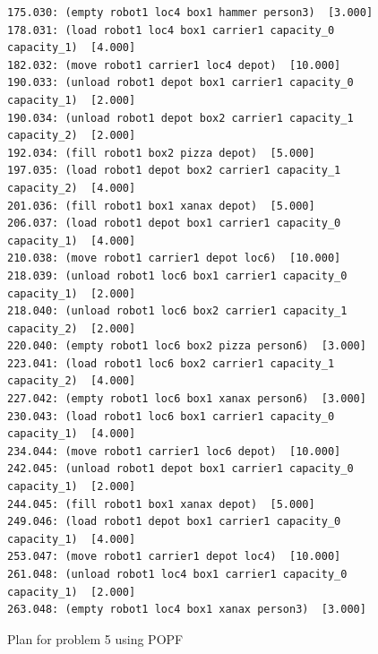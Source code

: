 \begin{figure}[h!]
\begin{verbatim}
175.030: (empty robot1 loc4 box1 hammer person3)  [3.000]
178.031: (load robot1 loc4 box1 carrier1 capacity_0 capacity_1)  [4.000]
182.032: (move robot1 carrier1 loc4 depot)  [10.000]
190.033: (unload robot1 depot box1 carrier1 capacity_0 capacity_1)  [2.000]
190.034: (unload robot1 depot box2 carrier1 capacity_1 capacity_2)  [2.000]
192.034: (fill robot1 box2 pizza depot)  [5.000]
197.035: (load robot1 depot box2 carrier1 capacity_1 capacity_2)  [4.000]
201.036: (fill robot1 box1 xanax depot)  [5.000]
206.037: (load robot1 depot box1 carrier1 capacity_0 capacity_1)  [4.000]
210.038: (move robot1 carrier1 depot loc6)  [10.000]
218.039: (unload robot1 loc6 box1 carrier1 capacity_0 capacity_1)  [2.000]
218.040: (unload robot1 loc6 box2 carrier1 capacity_1 capacity_2)  [2.000]
220.040: (empty robot1 loc6 box2 pizza person6)  [3.000]
223.041: (load robot1 loc6 box2 carrier1 capacity_1 capacity_2)  [4.000]
227.042: (empty robot1 loc6 box1 xanax person6)  [3.000]
230.043: (load robot1 loc6 box1 carrier1 capacity_0 capacity_1)  [4.000]
234.044: (move robot1 carrier1 loc6 depot)  [10.000]
242.045: (unload robot1 depot box1 carrier1 capacity_0 capacity_1)  [2.000]
244.045: (fill robot1 box1 xanax depot)  [5.000]
249.046: (load robot1 depot box1 carrier1 capacity_0 capacity_1)  [4.000]
253.047: (move robot1 carrier1 depot loc4)  [10.000]
261.048: (unload robot1 loc4 box1 carrier1 capacity_0 capacity_1)  [2.000]
263.048: (empty robot1 loc4 box1 xanax person3)  [3.000] 
    \end{verbatim}
    \caption{Plan for problem 5 using POPF}
    \label{problem5_plan_popf}
\end{figure}

